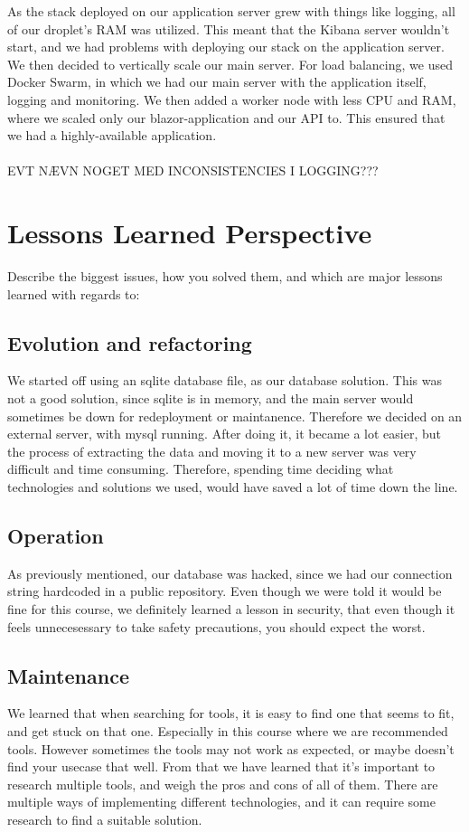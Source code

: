 \documentclass{article}
\begin{document}
As the stack deployed on our application server grew with things like logging, all of our droplet's RAM was utilized. This meant that the Kibana server wouldn't start, and we had problems with deploying our stack on the application server. We then decided to vertically scale our main server. For load balancing, we used Docker Swarm, in which we had our main server with the application itself, logging and monitoring. We then added a worker node with less CPU and RAM, where we scaled only our blazor-application and our API to. This ensured that we had a highly-available application. \\\\ EVT NÆVN NOGET MED INCONSISTENCIES I LOGGING???

\section{Lessons Learned Perspective}
Describe the biggest issues, how you solved them, and which are major lessons learned with regards to:
\subsection{Evolution and refactoring}
We started off using an sqlite database file, as our database solution. This was not a good solution, since sqlite is in memory, and the main server would sometimes be down for redeployment or maintanence. Therefore we decided on an external server, with mysql running. After doing it, it became a lot easier, but the process of extracting the data and moving it to a new server was very difficult and time consuming. Therefore, spending time deciding what technologies and solutions we used, would have saved a lot of time down the line.

\subsection{Operation}
As previously mentioned, our database was hacked, since we had our connection string hardcoded in a public repository. Even though we were told it would be fine for this course, we definitely learned a lesson in security, that even though it feels unnecesessary to take safety precautions, you should expect the worst.

\subsection{Maintenance}
We learned that when searching for tools, it is easy to find one that seems to fit, and get stuck on that one. Especially in this course where we are recommended tools. However sometimes the tools may not work as expected, or maybe doesn't find your usecase that well. From that we have learned that it's important to research multiple tools, and weigh the pros and cons of all of them. There are multiple ways of implementing different technologies, and it can require some research to find a suitable solution.

\end{document}
